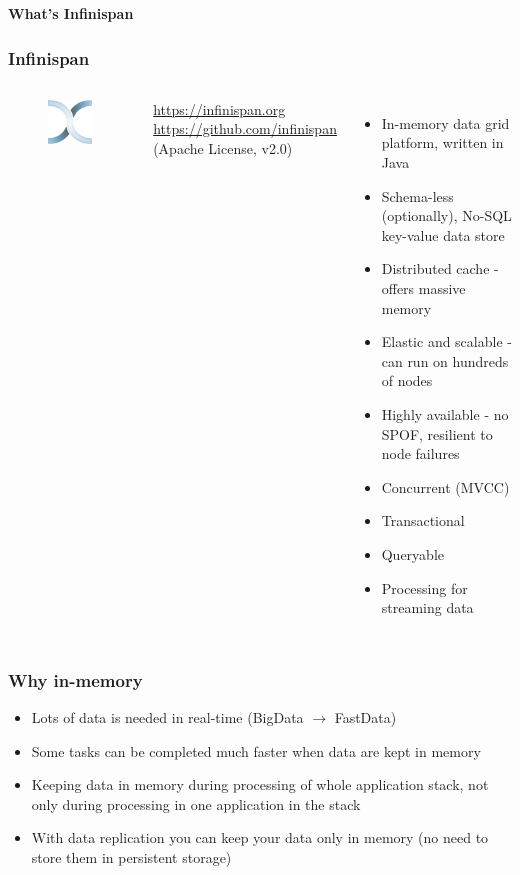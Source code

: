 \documentclass[10pt,utf8]{beamer}
\begin{document}
\begin{frame}
	\centering
	\huge{\textbf{What's Infinispan}}
\end{frame}

\begin{frame}
	\frametitle{Infinispan}
	\begin{columns}
		\begin{figure}
			\centering
			\includegraphics[width=3cm]{./img/infinispan.eps}
		\end{figure}
		\vspace{0.38cm}
		\color{blue}
			\url{https://infinispan.org}\\
			\vspace{0.1cm}
			\scriptsize{\url{https://github.com/infinispan}}\\
		\color{black}
		\scriptsize{(Apache License, v2.0)}
		\begin{itemize}
			\item In-memory data grid platform, written in Java
			\item Schema-less (optionally), No-SQL key-value data store
			\item Distributed cache - offers massive memory
			\item Elastic and scalable - can run on hundreds of nodes
			\item Highly available - no SPOF, resilient to node failures
			\item Concurrent (MVCC)
			\item Transactional
			\item Queryable
			\item Processing for streaming data
		\end{itemize}
	\end{columns}
\end{frame}

\begin{frame}
	\frametitle{Why in-memory}
	\begin{itemize}
	 \item Lots of data is needed in real-time (BigData $\rightarrow$ FastData)
	 \item Some tasks can be completed much faster when data are kept in memory
	 \item Keeping data in memory during processing of whole application stack, not only during processing in one application in the stack
	 \item With data replication you can keep your data only in memory (no need to store them in persistent storage)
	\end{itemize}
\end{frame}
\end{document}
